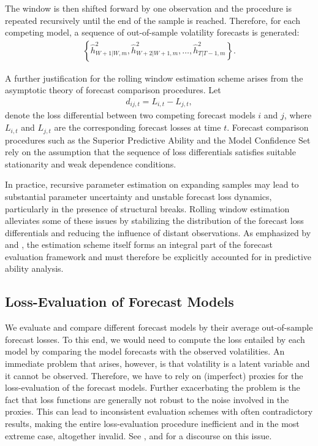 \documentclass{article} %
\begin{document}
	The window is then shifted forward by one observation and the procedure is repeated recursively until the end of the sample is reached. Therefore, for each competing model, a sequence of out-of-sample volatility forecasts is generated:
	\begin{align}
		\left\{\hat{h}_{W+1|W,m}^2,
		\hat{h}_{W+2|W+1,m}^2,
		\dots,
		\hat{h}_{T|T-1,m}^2 \right\}.
	\end{align}
	
	A further justification for the rolling window estimation scheme arises from the asymptotic theory of forecast comparison procedures. Let
	\begin{align}
		d_{ij,t}
		=
		L_{i,t}
		-
		L_{j,t},
	\end{align}
	denote the loss differential between two competing forecast models $i$ and $j$, where $L_{i,t}$ and $L_{j,t}$ are the corresponding forecast losses at time $t$. Forecast comparison procedures such as the Superior Predictive Ability and the Model Confidence Set rely on the assumption that the sequence of loss differentials satisfies suitable stationarity and weak dependence conditions.
	
	In practice, recursive parameter estimation on expanding samples may lead to substantial parameter uncertainty and unstable forecast loss dynamics, particularly in the presence of structural breaks. Rolling window estimation alleviates some of these issues by stabilizing the distribution of the forecast loss differentials and reducing the influence of distant observations. As emphasized by \textcite{GIACOMINIWHITE2006} and \textcite{HANSENLUNDE_NASON2011}, the estimation scheme itself forms an integral part of the forecast evaluation framework and must therefore be explicitly accounted for in predictive ability analysis.
		
	\subsection{Loss-Evaluation of Forecast Models}\label{sec:loss-evaluation}
	We evaluate and compare different forecast models by their average out-of-sample forecast losses. To this end, we would need to compute the loss entailed by each model by comparing the model forecasts with the observed volatilities. An immediate problem that arises, however, is that volatility is a latent variable and it cannot be observed. Therefore, we have to rely on (imperfect) proxies for the loss-evaluation of the forecast models. Further exacerbating the problem is the fact that loss functions are generally not robust to the noise involved in the proxies. This can lead to inconsistent evaluation schemes with often contradictory results, making the entire loss-evaluation procedure inefficient and in the most extreme case, altogether invalid. See \textcite{PAGAN1990267}, \textcite{BOLLERSLEVGHYSEL1994} and \textcite{ANDERSEN1999457} for a discourse on this issue.
	
\end{document}
